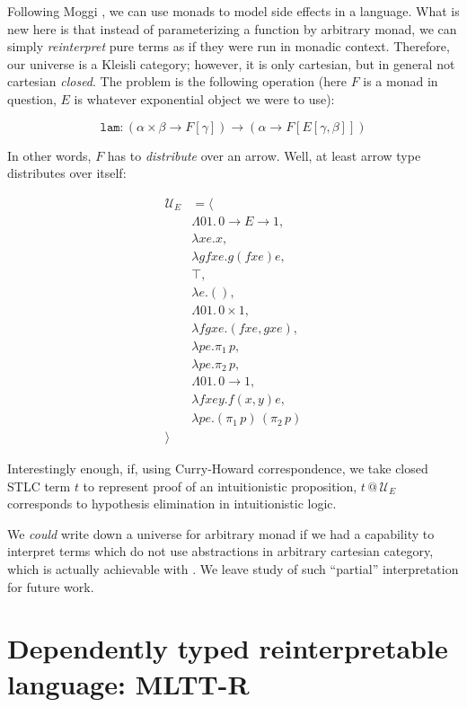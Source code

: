 \documentclass[acmsmall, review, screen, authorversion]{acmart}
\begin{document}
Following Moggi \cite{MOGGI199155}, we can use monads to model side
effects in a language. What is new here is that instead of
parameterizing a function by arbitrary monad, we can simply
\textit{reinterpret} pure terms as if they were run in monadic
context. Therefore, our universe is a Kleisli category; however, it
is only cartesian, but in general not cartesian \textit{closed}. The
problem is the following operation (here $F$ is a monad in question,
$E$ is whatever exponential object we were to use):

\[
    \mathtt{lam}:(\alpha\times\beta\to F[\gamma])
        \to(\alpha\to F[E[\gamma,\beta]])
\]

In other words, $F$ has to \textit{distribute} over an arrow. Well,
at least arrow type distributes over itself:

\begin{align*}
    \mathcal{U}_E &= \langle\\
        &\Lambda01.\,0\to E\to1,\\
        &\lambda x e.x,\\
        &\lambda gfxe.g(fxe)e,\\
        &\top,\\
        &\lambda e.(),\\
        &\Lambda01.\,0\times1,\\
        &\lambda fgxe.(fxe,gxe),\\
        &\lambda pe.\pi_1\,p,\\
        &\lambda pe.\pi_2\,p,\\
        &\Lambda01.\,0\to1,\\
        &\lambda fxey.f(x,y)e,\\
        &\lambda pe.(\pi_1\,p)\,(\pi_2\,p)\\
    \rangle
\end{align*}

Interestingly enough, if, using Curry-Howard correspondence, we take
closed STLC term $t$ to represent proof of an intuitionistic
proposition, $t\,@\,\mathcal{U}_E$ corresponds to hypothesis
elimination in intuitionistic logic.

We \textit{could} write down a universe for arbitrary monad if we had
a capability to interpret terms which do not use abstractions in
arbitrary cartesian category, which is actually achievable with
\cite{Elliott:Compcat2017}. We leave study of such ``partial''
interpretation for future work.

\section{Dependently typed reinterpretable language: MLTT-R}
\label{MLTT-R}
\end{document}
